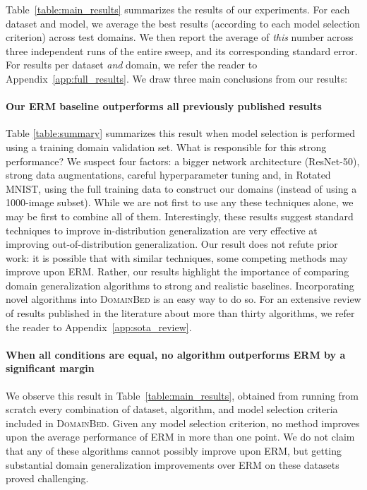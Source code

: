 \documentclass{article}
\newcommand{\domainbed}{\textsc{DomainBed}\xspace}
\begin{document}
Table~\ref{table:main_results} summarizes the results of our experiments.
%
For each dataset and model, we average the best results (according to each model selection criterion) across test domains. We then report the average of \textit{this} number across three independent runs of the entire sweep, and its corresponding standard error.
%
For results per dataset \emph{and} domain, we refer the reader to Appendix~\ref{app:full_results}.
%
We draw three main conclusions from our results:

\paragraph{Our ERM baseline outperforms all previously published results}
%
Table \ref{table:summary} summarizes this result when model selection is performed using a training domain validation set.
%
What is responsible for this strong performance?
%
We suspect four factors: a bigger network architecture (ResNet-50), strong data augmentations, careful hyperparameter tuning and, in Rotated MNIST, using the full training data to construct our domains (instead of using a 1000-image subset).
%
While we are not first to use any these techniques alone, we may be first to combine all of them.
%
Interestingly, these results suggest standard techniques to improve in-distribution generalization are very effective at improving out-of-distribution generalization.
%
Our result does not refute prior work: it is possible that with similar techniques, some competing methods may improve upon ERM.
%
Rather, our results highlight the importance of comparing domain generalization algorithms to strong and realistic baselines.
%
Incorporating novel algorithms into \domainbed is an easy way to do so.
%
For an extensive review of results published in the literature about more than thirty algorithms, we refer the reader to Appendix~\ref{app:sota_review}.

\paragraph{When all conditions are equal, no algorithm outperforms ERM by a significant margin}
%
We observe this result in Table~\ref{table:main_results}, obtained from running from scratch every combination of dataset, algorithm, and model selection criteria included in \domainbed.
%
Given any model selection criterion, no method improves upon the average performance of ERM in more than one point.
%
We do not claim that any of these algorithms cannot possibly improve upon ERM, but getting substantial domain generalization improvements over ERM on these datasets proved challenging. 
\end{document}
